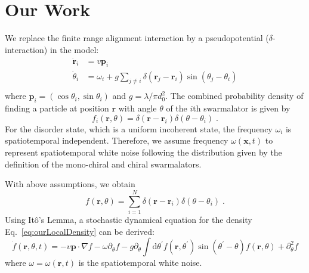 \documentclass{article}
\begin{document}
\section{Our Work}
We replace the finite range alignment interaction by a pseudopotential ($\delta$-interaction) in the model:
\begin{equation}
    \label{eq:ourModel}
    \begin{aligned}
        \dot{\mathbf{r}}_i&=v\mathbf{p}_i\\
        \dot{\theta}_i&=\omega _i+g \sum_{j\ne i}{\delta}\left( \mathbf{r}_j-\mathbf{r}_i \right) \sin \left( \theta _j-\theta _i \right)\\
    \end{aligned}
\end{equation}
where $\mathbf{p}_i=(\cos\theta_i, \sin\theta_i)$ and $g=\lambda/\pi d_0^{2}$. The combined probability density of finding a particle at position $\mathbf{r}$ with angle $\theta$ of the $i$th swarmalator is given by
\begin{equation}
    f_i\left( \mathbf{r},\theta \right) =\delta \left( \mathbf{r}-\mathbf{r}_i \right) \delta \left( \theta -\theta _i \right)\;.
\end{equation}
For the disorder state, which is a uniform incoherent state, the frequency $\omega_i$ is spatiotemporal independent. Therefore, we assume frequency $\omega(\mathbf{x}, t)$ to represent spatiotemporal white noise following the distribution given by the definition of the mono-chiral and chiral swarmalators.

With above assumptions, we obtain
\begin{equation}
    \label{eq:ourLocalDensity}
    f\left( \mathbf{r},\theta \right)=\sum_{i=1}^N{\delta \left( \mathbf{r}-\mathbf{r}_i \right)\delta \left( \theta-\theta _i \right)}\;.
\end{equation}
Using It\^{o}'s Lemma, a stochastic dynamical equation for the density Eq.~\eqref{eq:ourLocalDensity} can be derived:
\begin{equation}
    \dot{f}(\mathbf{r},\theta ,t)=-v\mathbf{p}\cdot \nabla f-\omega \partial _{\theta}f-g\partial _{\theta}\int{\mathrm{d}}\theta ^{\prime}f\left( \mathbf{r},\theta ^{\prime} \right) \sin \left( \theta ^{\prime}-\theta \right) f(\mathbf{r},\theta )+\partial _{\theta}^{2}f
\end{equation}
where $\omega=\omega\left(\mathbf{r}, t\right)$ is the spatiotemporal white noise.
\end{document}
